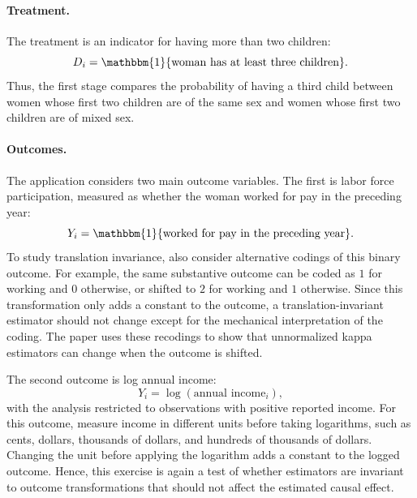 \documentclass[12pt,a4paper]{article}
\begin{document}
\paragraph{Treatment.}
The treatment is an indicator for having more than two children:
\begin{equation}
    D_i = \mathbbm{1}\{\text{woman has at least three children}\}.
\end{equation}
Thus, the first stage compares the probability of having a third child between women whose first two children are of the same sex and women whose first two children are of mixed sex. 

\paragraph{Outcomes.}
The application considers two main outcome variables. The first is labor force participation, measured as whether the woman worked for pay in the preceding year:
\begin{equation}
    Y_i = \mathbbm{1}\{\text{worked for pay in the preceding year}\}.
\end{equation}
To study translation invariance, \citet{sloczynski2025abadie} also consider alternative codings of this binary outcome. For example, the same substantive outcome can be coded as $1$ for working and $0$ otherwise, or shifted to $2$ for working and $1$ otherwise. Since this transformation only adds a constant to the outcome, a translation-invariant estimator should not change except for the mechanical interpretation of the coding. The paper uses these recodings to show that unnormalized kappa estimators can change when the outcome is shifted.

The second outcome is log annual income:
\begin{equation}
    Y_i = \log(\text{annual income}_i),
\end{equation}
with the analysis restricted to observations with positive reported income. For this outcome, \citet{sloczynski2025abadie} measure income in different units before taking logarithms, such as cents, dollars, thousands of dollars, and hundreds of thousands of dollars. Changing the unit before applying the logarithm adds a constant to the logged outcome. Hence, this exercise is again a test of whether estimators are invariant to outcome transformations that should not affect the estimated causal effect.
\end{document}
